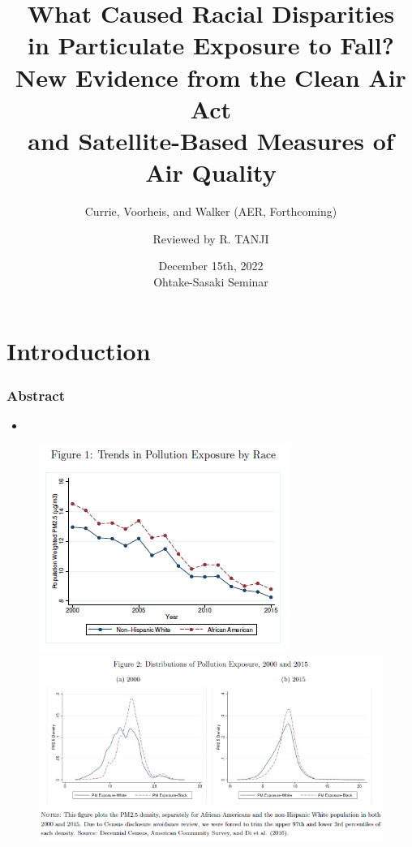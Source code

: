 \documentclass[dvipdfmx,11pt]{beamer}
\title[Currie, Voorheis, and Walker, Forthcoming]{What Caused Racial Disparities \\ in Particulate Exposure to Fall? \\ New Evidence from the Clean Air Act \\ and Satellite-Based Measures of Air Quality}
\subtitle{Currie, Voorheis, and Walker (AER, Forthcoming)}
\author{Reviewed by R. TANJI}
\date[12/15/2022 OS Semi.]{December 15th, 2022 \\ Ohtake-Sasaki Seminar}
\institute[]{Osaka University, Graduate School of Economics}
\begin{document}
\begin{frame}\frametitle{}
\titlepage
\end{frame}

\section{Introduction}
\frame{\tableofcontents}

\begin{frame}\frametitle{Abstract}
  \begin{itemize}
    \item 
  \end{itemize}
\end{frame}

\begin{frame}{}
  \begin{figure}
    \centering
    \includegraphics[scale = .5]{F1.png}
    \includegraphics[scale = .5]{F2.png}
  \end{figure}
\end{frame}
\end{document}
